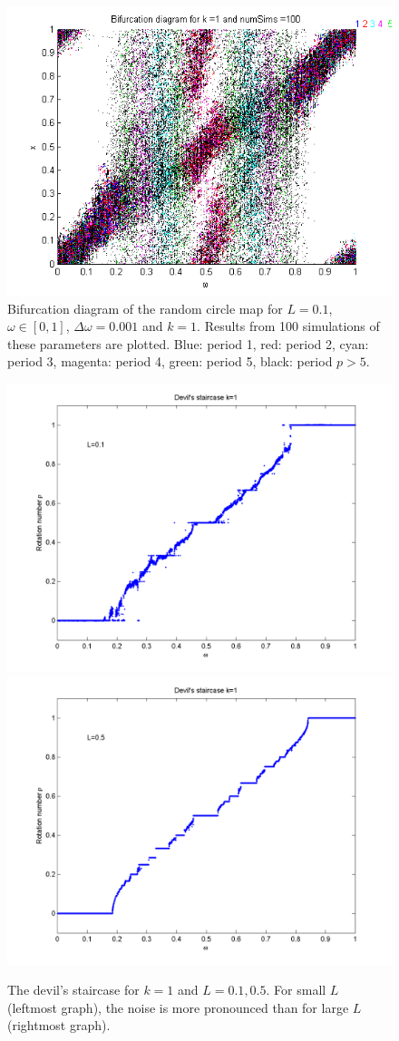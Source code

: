 \begin{figure}[!h]
\caption[Bifurcation diagram of the random
circle map]{Bifurcation diagram of the random
circle map for $L=0.1$, $\omega \in [0,1]$, $\Delta \omega = 0.001$
and $k=1$. Results from 100 simulations of these parameters are
plotted. Blue: period 1, red:
period 2, cyan: period 3, magenta: period 4, green: period 5, black:
period $p > 5$.} 
	\begin{center}
		\includegraphics[scale=0.7]{figs/rcirc_bif_L01_k1.png}
	\end{center}
\end{figure}

\begin{figure}[htp]
\caption[The devil's staircase for the random circle map]{The devil's
  staircase for $k=1$ and $L = 0.1,0.5$. For small $L$
  (leftmost graph), the noise is more pronounced than for large $L$
  (rightmost graph).}\label{fig:randdevil1}
\centering
\includegraphics[width=.5\textwidth]{figs/rdevil_k1_L01.png}\hfill
\includegraphics[width=.5\textwidth]{figs/rdevil_k1_L05.png}
\end{figure}


